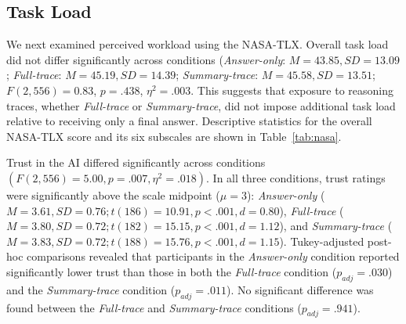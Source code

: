 \documentclass[manuscript, anonymous=false,authorversion,review=false]{acmart}
\begin{document}
\subsection{Task Load}

We next examined perceived workload using the NASA-TLX. Overall task load did not differ significantly across conditions (\textit{Answer-only}: $M=43.85,SD=13.09$; \textit{Full-trace}: $M=45.19,SD=14.39$; \textit{Summary-trace}: $M=45.58,SD=13.51$; $F(2, 556) = 0.83$, $p = .438$, $\eta^2 = .003$. This suggests that exposure to reasoning traces, whether \textit{Full-trace} or \textit{Summary-trace}, did not impose additional task load relative to receiving only a final answer. Descriptive statistics for the overall NASA-TLX score and its six subscales are shown in Table~\ref{tab:nasa}.



Trust in the AI differed significantly across conditions $(F(2,556) = 5.00, p = .007,\eta^2 = .018)$. In all three conditions, trust ratings were significantly above the scale midpoint ($\mu = 3$): \textit{Answer-only} ($M = 3.61, SD = 0.76; t(186) = 10.91, p < .001, d = 0.80$), \textit{Full-trace} ($M = 3.80, SD = 0.72; t(182) = 15.15, p < .001, d = 1.12$), and \textit{Summary-trace} ($M = 3.83, SD = 0.72; t(188) = 15.76, p < .001, d = 1.15$). Tukey-adjusted post-hoc comparisons revealed that participants in the \textit{Answer-only }condition reported significantly lower trust than those in both the \textit{Full-trace} condition ($p_{adj} = .030$) and the \textit{Summary-trace} condition ($p_{adj} = .011$). No significant difference was found between the \textit{Full-trace} and \textit{Summary-trace} conditions ($p_{adj} = .941$).
\end{document}
